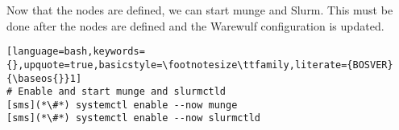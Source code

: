 Now that the nodes are defined, we can start munge and Slurm.  This must be done
after the nodes are defined and the Warewulf configuration is updated.

\begin{lstlisting}[language=bash,keywords={},upquote=true,basicstyle=\footnotesize\ttfamily,literate={BOSVER}{\baseos{}}1]
# Enable and start munge and slurmctld
[sms](*\#*) systemctl enable --now munge
[sms](*\#*) systemctl enable --now slurmctld
\end{lstlisting}
